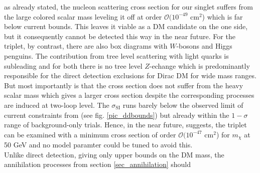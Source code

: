 as already stated, the nucleon scattering cross section for our singlet suffers from the large colored scalar mass leveling it off at order 
$\mathcal{O}(10^{-49}$ cm$^2$) which is far below current bounds. This leaves it viable as a DM candidate on the one side, but it consequently cannot
be detected this way in the near future. For the triplet, by contrast, there are also box diagrams with $W$-bosons and Higgs penguins. The 
contribution
from tree level scattering with light quarks is subleading and for both there is no tree level $Z$-echange which is predominantly responsible
for the direct detection exclusions for Dirac DM for wide mass ranges. But most importantly is that the cross section does not suffer from the 
heavy scalar mass which gives a larger cross section despite the corresponding processes are induced at two-loop level. The $\sigma_\text{SI}$
runs barely below the observed limit of current constraints from \cite{1607.02475} (see fig. \ref{pic_ddbounds}) but already within the $1-\sigma$
range of background-only trials. Hence, in the near future, \cite{1512.07501} suggests, the triplet can be examined with a minimum cross section
of order $\mathcal{O}(10^{-47}$ cm$^2$) for $m_\chi$ at 50 GeV and no model paramter could be tuned to avoid this.\\
% 
% 
% 
% 
% 
% 
\noindent Unlike direct detection, giving only upper bounds on the DM mass, the annihilation processes from section \ref{sec_annihilation} should
